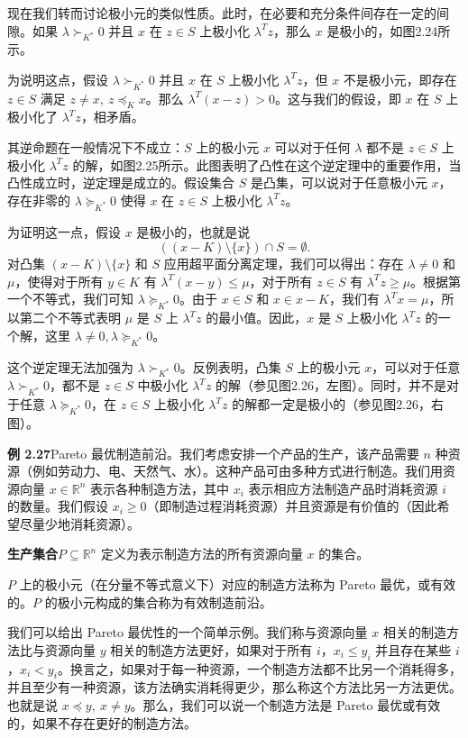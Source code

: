 \documentclass[UTF8, 12pt, fontset=fandol, oneside]{ctexart}
\begin{document}
现在我们转而讨论极小元的类似性质。此时，在必要和充分条件间存在一定的间隙。如果 $\lambda\succ_{K^*}0$ 并且 $x$ 在 $z\in S$ 上极小化 $\lambda^Tz$，那么 $x$ 是极小的，如图2.24所示。

为说明这点，假设 $\lambda\succ_{K^*}0$ 并且 $x$ 在 $S$ 上极小化 $\lambda^Tz$，但 $x$ 不是极小元，即存在 $z\in S$ 满足 $z\ne x,\ z\preceq_K x$。那么 $\lambda^T(x-z)>0$。这与我们的假设，即 $x$ 在 $S$ 上极小化了 $\lambda^Tz$，相矛盾。

其逆命题在一般情况下不成立：$S$ 上的极小元 $x$ 可以对于任何 $\lambda$ 都不是 $z\in S$ 上极小化 $\lambda^Tz$ 的解，如图2.25所示。此图表明了凸性在这个逆定理中的重要作用，当凸性成立时，逆定理是成立的。假设集合 $S$ 是凸集，可以说对于任意极小元 $x$，存在非零的 $\lambda\succeq_{K^*}0$ 使得 $x$ 在 $z\in S$ 上极小化 $\lambda^Tz$。

为证明这一点，假设 $x$ 是极小的，也就是说
\[
  ((x-K)\setminus\{x\})\cap S=\emptyset.
\]
对凸集 $(x-K)\setminus\{x\}$ 和 $S$ 应用超平面分离定理，我们可以得出：存在 $\lambda\ne0$ 和 $\mu$，使得对于所有 $y\in K$ 有 $\lambda^T(x-y)\le\mu$，对于所有 $z\in S$ 有 $\lambda^Tz\ge\mu$。根据第一个不等式，我们可知 $\lambda\succeq_{K^*}0$。由于 $x\in S$ 和 $x\in x-K$，我们有 $\lambda^Tx=\mu$，所以第二个不等式表明 $\mu$ 是 $S$ 上 $\lambda^Tz$ 的最小值。因此，$x$ 是 $S$ 上极小化 $\lambda^Tz$ 的一个解，这里 $\lambda\ne0,\lambda\succeq_{K^*}0$。

这个逆定理无法加强为 $\lambda\succ_{K^*}0$。反例表明，凸集 $S$ 上的极小元 $x$，可以对于任意 $\lambda\succ_{K^*}0$，都不是 $z\in S$ 中极小化 $\lambda^Tz$ 的解（参见图2.26，左图）。同时，并不是对于任意 $\lambda\succeq_{K^*}0$，在 $z\in S$ 上极小化 $\lambda^Tz$ 的解都一定是极小的（参见图2.26，右图）。

\noindent\textbf{例 2.27}\quad Pareto 最优制造前沿。我们考虑安排一个产品的生产，该产品需要 $n$ 种资源（例如劳动力、电、天然气、水）。这种产品可由多种方式进行制造。我们用资源向量 $x\in\mathbb{R}^n$ 表示各种制造方法，其中 $x_i$ 表示相应方法制造产品时消耗资源 $i$ 的数量。我们假设 $x_i\ge0$（即制造过程消耗资源）并且资源是有价值的（因此希望尽量少地消耗资源）。

\noindent\textbf{生产集合}\quad $P\subseteq\mathbb{R}^n$ 定义为表示制造方法的所有资源向量 $x$ 的集合。

$P$ 上的极小元（在分量不等式意义下）对应的制造方法称为 Pareto 最优，或有效的。$P$ 的极小元构成的集合称为有效制造前沿。

我们可以给出 Pareto 最优性的一个简单示例。我们称与资源向量 $x$ 相关的制造方法比与资源向量 $y$ 相关的制造方法更好，如果对于所有 $i$，$x_i\le y_i$ 并且存在某些 $i$，$x_i<y_i$。换言之，如果对于每一种资源，一个制造方法都不比另一个消耗得多，并且至少有一种资源，该方法确实消耗得更少，那么称这个方法比另一方法更优。也就是说 $x\preceq y,\ x\ne y$。那么，我们可以说一个制造方法是 Pareto 最优或有效的，如果不存在更好的制造方法。
\end{document}
